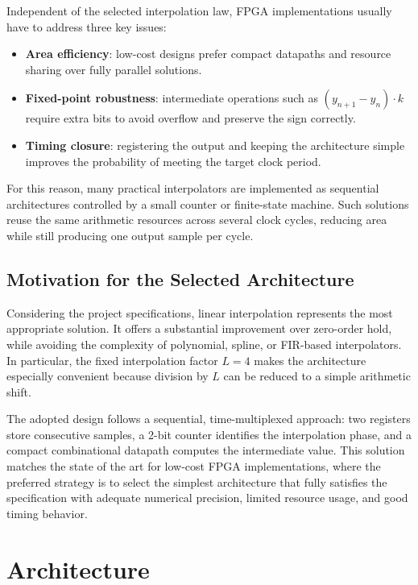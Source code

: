 \documentclass[a4paper,11pt]{article}
\begin{document}
Independent of the selected interpolation law, FPGA implementations usually have to address three key issues:
\begin{itemize}
    \item \textbf{Area efficiency}: low-cost designs prefer compact datapaths and resource sharing over fully parallel solutions.
    \item \textbf{Fixed-point robustness}: intermediate operations such as $(y_{n+1} - y_n)\cdot k$ require extra bits to avoid overflow and preserve the sign correctly.
    \item \textbf{Timing closure}: registering the output and keeping the architecture simple improves the probability of meeting the target clock period.
\end{itemize}

For this reason, many practical interpolators are implemented as sequential architectures controlled by a small counter or finite-state machine. Such solutions reuse the same arithmetic resources across several clock cycles, reducing area while still producing one output sample per cycle.

\subsection{Motivation for the Selected Architecture}

Considering the project specifications, linear interpolation represents the most appropriate solution. It offers a substantial improvement over zero-order hold, while avoiding the complexity of polynomial, spline, or FIR-based interpolators. In particular, the fixed interpolation factor $L = 4$ makes the architecture especially convenient because division by $L$ can be reduced to a simple arithmetic shift.

The adopted design follows a sequential, time-multiplexed approach: two registers store consecutive samples, a 2-bit counter identifies the interpolation phase, and a compact combinational datapath computes the intermediate value. This solution matches the state of the art for low-cost FPGA implementations, where the preferred strategy is to select the simplest architecture that fully satisfies the specification with adequate numerical precision, limited resource usage, and good timing behavior.

\newpage
\section{Architecture}
\end{document}
